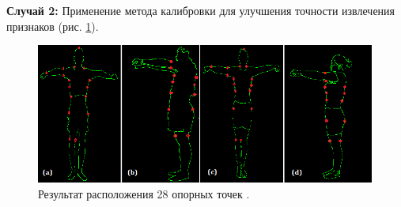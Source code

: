 \textbf{Случай 2:} Применение метода калибровки для улучшения точности извлечения признаков (рис. \ref{img152}).
\begin{figure}[ht!]
\centering
\includegraphics [scale=0.8] {images/h152.png}
\begin{center}
\caption{Результат расположения 28 опорных точек  \cite{long1,long2}.} \label{img152}
\end{center}
\end{figure}
